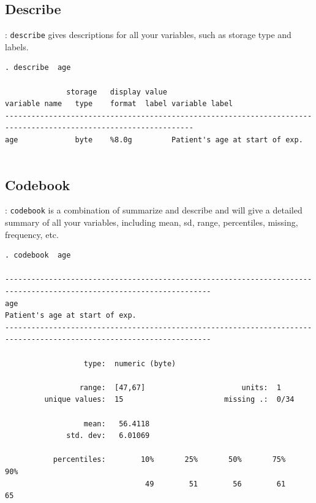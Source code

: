 \documentclass{beamer}
\begin{document}
\subsection{Describe}
\begin{frame}[fragile]{\secname : \subsecname}
\verb|describe| gives descriptions for all your variables, such as storage type and labels. \\[4mm]
\small
\begin{verbatim}
. describe  age 

              storage   display value
variable name   type    format  label variable label
-----------------------------------------------------------------------------------------------------------------
age             byte    %8.0g         Patient's age at start of exp.


\end{verbatim}

\end{frame}

\subsection{Codebook}
\begin{frame}[fragile]{\secname : \subsecname}
\verb|codebook| is a combination of summarize and describe and will give a detailed summary of all your variables, including mean, sd, range, percentiles, missing, frequency, etc. \\[4mm]
\tiny
\begin{verbatim}
. codebook  age

---------------------------------------------------------------------------------------------------------------------
age                                                                      Patient's age at start of exp.
---------------------------------------------------------------------------------------------------------------------

                  type:  numeric (byte)

                 range:  [47,67]                      units:  1
         unique values:  15                       missing .:  0/34

                  mean:   56.4118
              std. dev:   6.01069

           percentiles:        10%       25%       50%       75%       90%
                                49        51        56        61        65

\end{verbatim}
\end{frame}
\end{document}
